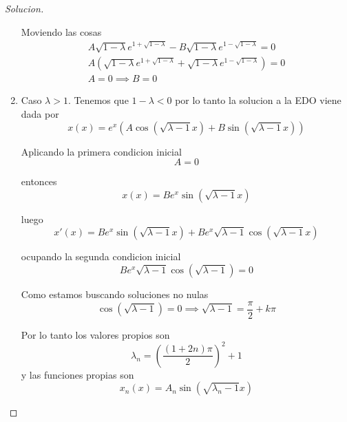 \documentclass{article}
\theoremstyle{definition}
\newenvironment{solution}{\begin{proof}[Solucion]}{\end{proof}}
\begin{document}
\begin{solution}
\begin{enumerate}
            Moviendo las cosas
            \begin{gather*}
              A\sqrt{1 - \lambda}e^{1 + \sqrt{1 - \lambda}}  - B\sqrt{1 - \lambda}e^{1 - \sqrt{1 - \lambda}} = 0\\
              A(\sqrt{1 - \lambda}e^{1 + \sqrt{1 - \lambda}} + \sqrt{1 - \lambda}e^{1 - \sqrt{1 - \lambda}}) = 0\\
              A = 0 \implies B = 0
            \end{gather*}
      \item Caso $\lambda > 1$. Tenemos que $1 - \lambda < 0$ por lo tanto la solucion a la EDO viene dada por
            \begin{equation*}
              x(x) = e^{x}(A \cos(\sqrt{\lambda - 1} x) + B \sin(\sqrt{\lambda - 1}x))
            \end{equation*}

            Aplicando la primera condicion inicial
            \begin{equation*}
              A = 0
            \end{equation*}

            entonces
            \begin{equation*}
              x(x) = B e^{x} \sin(\sqrt{\lambda - 1}x)
            \end{equation*}

            luego
            \begin{equation*}
              x'(x) = Be^{x} \sin(\sqrt{\lambda - 1} x) + Be^{x} \sqrt{\lambda - 1}\cos(\sqrt{\lambda - 1} x)
            \end{equation*}

            ocupando la segunda condicion inicial
            \begin{equation*}
              Be^{x}\sqrt{\lambda - 1} \cos(\sqrt{\lambda - 1}) = 0
            \end{equation*}

            Como estamos buscando soluciones no nulas
            \begin{equation*}
              \cos(\sqrt{\lambda - 1}) = 0 \implies \sqrt{\lambda - 1} = \frac{\pi}{2} + k \pi
            \end{equation*}

            Por lo tanto los valores propios son
            \begin{equation*}
              \lambda_{n} = (\frac{(1 + 2n)\pi}{2})^{2} + 1
            \end{equation*}
            y las funciones propias son
            \begin{equation*}
              x_{n}(x) = A_{n}\sin(\sqrt{\lambda_{n} - 1}x)
            \end{equation*}


\end{enumerate}
\end{solution}
\end{document}

